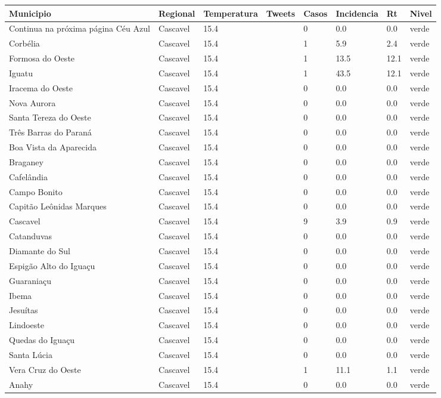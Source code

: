 \begin{longtable}{l|lllllll}
  \hline
Municipio & Regional & Temperatura & Tweets & Casos & Incidencia & Rt & Nivel \\ 
  \hline
\endhead
\hline
{\footnotesize Continua na próxima página}
\endfoot
\endlastfoot
Céu Azul & Cascavel & 15.4 &  & 0 & 0.0 & 0.0 & verde \\ 
  Corbélia & Cascavel & 15.4 &  & 1 & 5.9 & 2.4 & verde \\ 
  Formosa do Oeste & Cascavel & 15.4 &  & 1 & 13.5 & 12.1 & verde \\ 
  Iguatu & Cascavel & 15.4 &  & 1 & 43.5 & 12.1 & verde \\ 
  Iracema do Oeste & Cascavel & 15.4 &  & 0 & 0.0 & 0.0 & verde \\ 
  Nova Aurora & Cascavel & 15.4 &  & 0 & 0.0 & 0.0 & verde \\ 
  Santa Tereza do Oeste & Cascavel & 15.4 &  & 0 & 0.0 & 0.0 & verde \\ 
  Três Barras do Paraná & Cascavel & 15.4 &  & 0 & 0.0 & 0.0 & verde \\ 
  Boa Vista da Aparecida & Cascavel & 15.4 &  & 0 & 0.0 & 0.0 & verde \\ 
  Braganey & Cascavel & 15.4 &  & 0 & 0.0 & 0.0 & verde \\ 
  Cafelândia & Cascavel & 15.4 &  & 0 & 0.0 & 0.0 & verde \\ 
  Campo Bonito & Cascavel & 15.4 &  & 0 & 0.0 & 0.0 & verde \\ 
  Capitão Leônidas Marques & Cascavel & 15.4 &  & 0 & 0.0 & 0.0 & verde \\ 
  Cascavel & Cascavel & 15.4 &  & 9 & 3.9 & 0.9 & verde \\ 
  Catanduvas & Cascavel & 15.4 &  & 0 & 0.0 & 0.0 & verde \\ 
  Diamante do Sul & Cascavel & 15.4 &  & 0 & 0.0 & 0.0 & verde \\ 
  Espigão Alto do Iguaçu & Cascavel & 15.4 &  & 0 & 0.0 & 0.0 & verde \\ 
  Guaraniaçu & Cascavel & 15.4 &  & 0 & 0.0 & 0.0 & verde \\ 
  Ibema & Cascavel & 15.4 &  & 0 & 0.0 & 0.0 & verde \\ 
  Jesuítas & Cascavel & 15.4 &  & 0 & 0.0 & 0.0 & verde \\ 
  Lindoeste & Cascavel & 15.4 &  & 0 & 0.0 & 0.0 & verde \\ 
  Quedas do Iguaçu & Cascavel & 15.4 &  & 0 & 0.0 & 0.0 & verde \\ 
  Santa Lúcia & Cascavel & 15.4 &  & 0 & 0.0 & 0.0 & verde \\ 
  Vera Cruz do Oeste & Cascavel & 15.4 &  & 1 & 11.1 & 1.1 & verde \\ 
  Anahy & Cascavel & 15.4 &  & 0 & 0.0 & 0.0 & verde \\ 
  \hline
\end{longtable}
